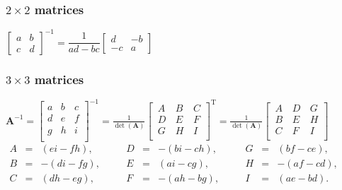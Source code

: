 \subsubsection{$2\times2$ matrices}
$\begin{bmatrix}
	a & b\\c & d
\end{bmatrix}^{-1}=\dfrac{1}{ad-bc}\begin{bmatrix}
	d & -b\\-c & a
\end{bmatrix}$

\subsubsection{$3\times3$ matrices}
$\mathbf {A} ^{-1}={\begin{bmatrix}a&b&c\\d&e&f\\g&h&i\\\end{bmatrix}}^{-1}={\frac {1}{\det(\mathbf {A} )}}{\begin{bmatrix}\,A&\,B&\,C\\\,D&\,E&\,F\\\,G&\,H&\,I\\\end{bmatrix}}^{\mathrm {T} }={\frac {1}{\det(\mathbf {A} )}}{\begin{bmatrix}\,A&\,D&\,G\\\,B&\,E&\,H\\\,C&\,F&\,I\\\end{bmatrix}}$\\
$\begin{alignedat}{6}A&={}&(ei-fh),&\quad &D&={}&-(bi-ch),&\quad &G&={}&(bf-ce),\\B&={}&-(di-fg),&\quad &E&={}&(ai-cg),&\quad &H&={}&-(af-cd),\\C&={}&(dh-eg),&\quad &F&={}&-(ah-bg),&\quad &I&={}&(ae-bd).\\\end{alignedat}$

\pagebreak

